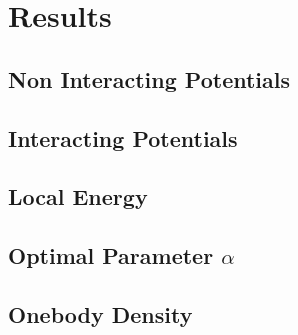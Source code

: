 \section{Results}\label{sec:Results}
\subsection{Non Interacting Potentials}
\subsection{Interacting Potentials}
\subsection{Local Energy}
\subsection{Optimal Parameter \(\alpha\)}
\subsection{Onebody Density}
